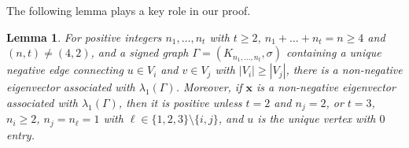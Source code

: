 \documentclass[12pt]{article}
\numberwithin{equation}{section}
\newtheorem {Lemma}{Lemma}[section]
\begin{document}
%
%
The following lemma plays a key role in our proof.


\begin{Lemma}\label{nne}  For positive integers $n_1,\dots, n_t$ with 
 $t\ge 2$, $n_1+\dots+n_t=n\ge 4$ and $(n,t)\ne (4,2)$, and a signed graph $\Gamma=(K_{n_1,\dots, n_t}, \sigma)$ containing  a unique negative edge connecting  $u\in V_i$ and $v\in V_j$ with $|V_i|\ge |V_j|$,
there is a non-negative eigenvector associated with $\lambda_1(\Gamma)$. 
Moreover, if $\mathbf{x}$ is a non-negative eigenvector associated with $\lambda_1(\Gamma)$, then it is positive unless
%
%
$t=2$ and $n_j=2$, or
$t=3$, $n_i\ge 2$, $n_j=n_\ell=1$ with $\ell\in \{1,2,3\}\setminus\{i,j\}$, and $u$ is the unique vertex with $0$ entry.
\end{Lemma}
\end{document}
